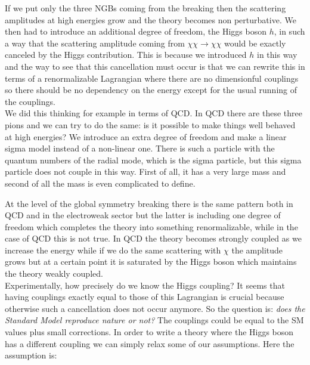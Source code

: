 \documentclass[../main.tex]{subfiles}
\begin{document}
\begin{kaobox}[frametitle=Remark on SU(2)$\times$SU(2) symmetry breaking]
If we put only the three NGBs coming from the breaking then the scattering amplitudes at high energies grow and the theory becomes non perturbative. We then had to introduce an additional degree of freedom, the Higgs boson $h$, in such a way that the scattering amplitude coming from $\chi\chi\to\chi\chi$ would be exactly canceled by the Higgs contribution. This is because we introduced $h$ in this way and the way to see that this cancellation must occur is that we can rewrite this in terms of a renormalizable Lagrangian where there are no dimensionful couplings so there should be no dependency on the energy except for the usual running of the couplings.\\
We did this thinking for example in terms of QCD. In QCD there are these three pions and we can try to do the same: is it possible to make things well behaved at high energies? We introduce an extra degree of freedom and make a linear sigma model instead of a non-linear one. There is such a particle with the quantum numbers of the radial mode, which is the sigma particle, but this sigma particle does not couple in this way. First of all, it has a very large mass and second of all the mass is even complicated to define.\\ 
\end{kaobox}
At the level of the global symmetry breaking there is the same pattern both in QCD and in the electroweak sector but the latter is including one degree of freedom which completes the theory into something renormalizable, while in the case of QCD this is not true. In QCD the theory becomes strongly coupled as we increase the energy while if we do the same scattering with $\chi$ the amplitude grows but at a certain point it is saturated by the Higgs boson which maintains the theory weakly coupled.\\
Experimentally, how precisely do we know the Higgs coupling? It seems that having couplings exactly equal to those of this Lagrangian is crucial because otherwise such a cancellation does not occur anymore. So the question is: \textit{does the Standard Model reproduce nature or not?} The couplings could be equal to the SM values plus small corrections. In order to write a theory where the Higgs boson has a different coupling we can simply relax some of our assumptions. Here the assumption is:
\end{document}
